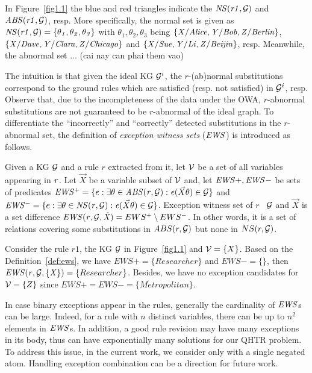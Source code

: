 \begin{example}\label{ex:abns}
In Figure~\ref{fig1.1} the blue and red triangles indicate the $\mathit{NS(r1,\mathcal{G})}$ and $\mathit{ABS(r1,\mathcal{G})}$, resp. More specifically, the normal set is given as $\mathit{NS(r1,\mathcal{G})}=\{\mathit{\theta_1,\theta_2,\theta_3}\}$ with $\theta_1,\theta_2,\theta_3$ being $\{\mathit{X/Alice,Y/Bob,Z/Berlin}\}$, $\{\mathit{X/Dave,Y/Clara,Z/Chicago}\}$ and $\{\mathit{X/Sue,Y/Li,Z/Beijin}\}$, resp. Meanwhile, the abnormal set ... (cai nay can phai them vao)
\end{example}

The intuition is that given the ideal KG $\mathcal{G}^i$, the $r$-(ab)normal substitutions correspond to the ground rules which are satisfied (resp. not satisfied) in $\mathcal{G}^i$, resp. Observe that, due to the incompleteness of the data under the OWA, $r$-abnormal substitutions are not guaranteed to be $r$-abnormal of the ideal graph. To differentiate the ``incorrectly'' and ``correctly'' detected substitutions in the $r$-abnormal set, the definition of \emph{exception witness sets} ($\mathit{EWS}$) is introduced as follows.

\begin{definition} \label{def:ews}
Given a KG $\mathcal{G}$ and a rule $r$ extracted from it, let $\mathcal{V}$ be a set of all variables appearing in $\mathit{r}$. Let $\vec{X}$ be a variable subset of $\mathcal{V}$ and, let $\mathit{EWS+, EWS-}$ be sets of predicates $\mathit{EWS^+}=\{e: \exists \theta \in \mathit{ABS(r,\mathcal{G})}: \mathit{e}(\vec{X}\theta)\in \mathcal{G}\}$ and $\mathit{EWS^-}=\{e: \exists \theta \in \mathit{NS(r,\mathcal{G})}: \mathit{e}(\vec{X}\theta)\in \mathcal{G}\}$. Exception witness set of $r$ \wrt\ $\mathcal{G}$ and $\vec{X}$ is a set difference $\mathit{EWS(r,\mathcal{G},\vec{X})}=EWS^+ \setminus EWS^-$. In other words, it is a set of relations covering some substitutions in $ABS(r, \mathcal{G})$ but none in $NS(r, \mathcal{G})$.
\end{definition}

\begin{example}
Consider the rule $r1$, the KG $\mathcal{G}$ in Figure~\ref{fig1.1} and $\mathcal{V} = \{X\}$. Based on the Definition~\ref{def:ews}, we have $EWS+ = \{Researcher\}$ and $EWS- = \{\}$, then $\mathit{EWS(r,\mathcal{G},\{X\})}=\{Researcher\}$. Besides, we have no exception candidates for $\mathcal{V} = \{Z\}$ since $EWS+ = EWS- = \{Metropolitan\}$.
\end{example}

In case binary exceptions appear in the rules, generally the cardinality of $\mathit{EWS}$s can be large. Indeed, for a rule with $n$ distinct variables, there can be up to $n^2$ elements in $\mathit{EWS}$s. In addition, a good rule revision may have many exceptions in its body, thus can have exponentially many solutions for our QHTR problem. To address this issue, in the current work, we consider only with a single negated atom. Handling exception combination can be a direction for future work.


